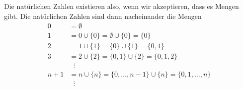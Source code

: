 Die natürlichen Zahlen existieren also, wenn wir akzeptieren, dass es
Mengen gibt.
Die natürlichen Zahlen sind dann nacheinander die Mengen
\begin{align*}
0 &= \emptyset 
\\
1 &= 0 \cup \{0\} = \emptyset \cup \{0\} = \{0\}
\\
2 &= 1 \cup \{1\} = \{0\}\cup\{1\} = \{0,1\}
\\
3 &= 2 \cup \{2\} = \{0,1\}\cup \{2\} = \{0,1,2\}
\\
&\phantom{n}\vdots
\\
n+1&= n \cup \{n\} = \{0,\dots,n-1\} \cup \{n\} = \{0,1,\dots,n\}
\\
&\phantom{n}\vdots
\end{align*}





